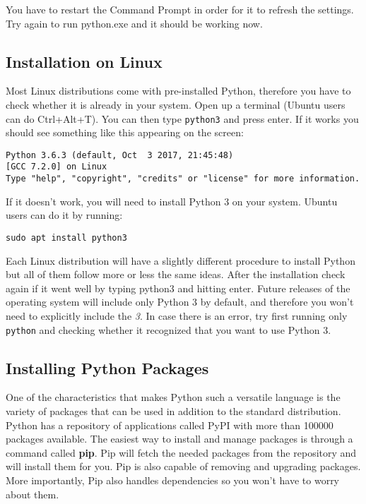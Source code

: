 You have to restart the Command Prompt in order for it to refresh the settings. Try again to run python.exe and it should be working now.

\subsection{Installation on Linux}
Most Linux distributions come with pre-installed Python, therefore you have to check whether it is already in your system. Open up a terminal (Ubuntu users can do Ctrl+Alt+T). You can then type \texttt{python3} and press enter. If it works you should see something like this appearing on the screen:

\begin{verbatim}
Python 3.6.3 (default, Oct  3 2017, 21:45:48)
[GCC 7.2.0] on Linux
Type "help", "copyright", "credits" or "license" for more information.
\end{verbatim}

If it doesn't work, you will need to install Python 3 on your system. Ubuntu users can do it by running:
\begin{verbatim}
sudo apt install python3
\end{verbatim}

Each Linux distribution will have a slightly different procedure to install Python but all of them follow more or less the same ideas. After the installation check again if it went well by typing python3 and hitting enter. Future releases of the operating system will include only Python 3 by default, and therefore you won't need to explicitly include the \emph{3}. In case there is an error, try first running only \texttt{python} and checking whether it recognized that you want to use Python 3.

\subsection{Installing Python Packages}
One of the characteristics that makes Python such a versatile language is the variety of packages that can be used in addition to the standard distribution. Python has a repository of applications called PyPI with more than 100000 packages available. The easiest way to install and manage packages is through a command called \textbf{pip}. Pip will fetch the needed packages from the repository and will install them for you. Pip is also capable of removing and upgrading packages. More importantly, Pip also handles dependencies so you won’t have to worry about them.

